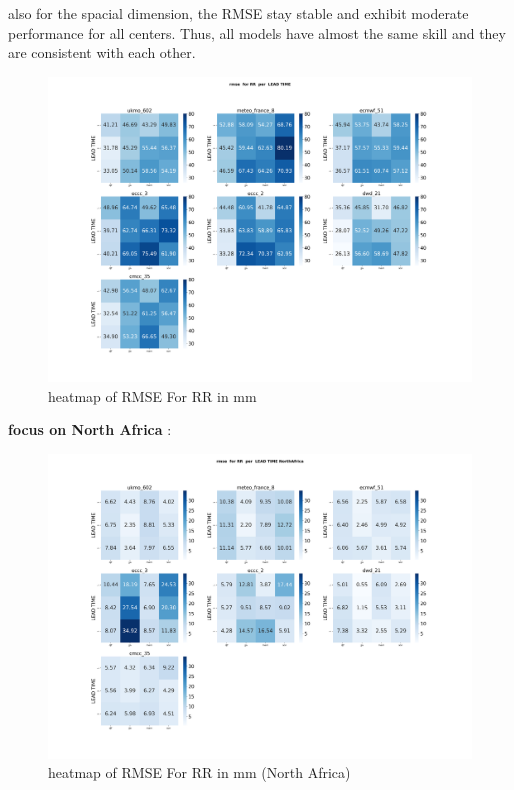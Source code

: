 also for the spacial dimension, the RMSE stay stable and exhibit moderate performance for all centers. Thus, all models have almost the same skill and they are consistent with each other.

\begin{figure}[H]
\centering
\includegraphics[scale=0.3]{plots/det/rmse/rmse_RR_mena.png}
\caption{heatmap of RMSE For RR in mm}
\end{figure}

\vspace{1.5cm}

\textbf{focus on North Africa} : 
\begin{figure}[H]
\centering
\includegraphics[scale=0.3]{plots/det/rmse/rmse_RR_NorthAfrica.png}
\caption{heatmap of RMSE For RR in mm (North Africa)}
\end{figure}


